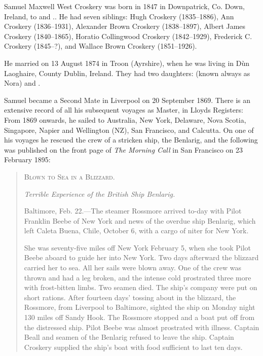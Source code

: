 
Samuel Maxwell West Croskery was born in 1847 in Downpatrick, Co. Down, Ireland, to  and .\cite{SMWC-MG-marriage}. He had seven siblings: Hugh Croskery (1835--1886), Ann Croskery (1836--1931), Alexander Brown Croskery (1838--1897), Albert James Croskery (1840--1865), Horatio Collingwood Croskery (1842--1929), Frederick C. Croskery (1845--?), and Wallace Brown Croskery (1851--1926).

He married  on 13 August 1874 in Troon (Ayrshire), when he was living in D\`{u}n Laoghaire, County Dublin, Ireland.\cite{SMWC-MG-marriage} They had two daughters:  (known always as Nora) and .

Samuel became a Second Mate in Liverpool on 20 September 1869. There is an extensive record of all his subsequent voyages as Master, in Lloyds Registers:\cite{MarineRecordsSMWC} From 1869 onwards, he sailed to Australia, New York, Delaware, Nova Scotia, Singapore, Napier and Wellington (NZ), San Francisco, and Calcutta. On one of his voyages he rescued the crew of a stricken ship, the Benlarig, and the following was published on the front page of \emph{The Morning Call} in San Francisco on 23 February 1895:

\begin{quotation}
\textsc{Blown to Sea in a Blizzard.}

\emph{Terrible Experience of the British Ship Benlarig.}

Baltimore, Feb. 22.---The steamer Rossmore arrived to-day with Pilot Franklin Beebe of New York and news of the overdue ship Benlarig, which left Caleta Buena, Chile, October 6, with a cargo of niter for New York.

She was seventy-five miles off New York February 5, when she took Pilot Beebe aboard to guide her into New York. Two days afterward the blizzard carried her to sea. All her sails were blown away. One of the crew was thrown and had a leg broken, and the intense cold prostrated three more with frost-bitten limbs. Two seamen died. The ship's company were put on short rations. After fourteen days' tossing about in the blizzard, the Rossmore, from Liverpool to Baltimore, sighted the ship on Monday night 130 miles off Sandy Hook. The Rossmore stopped and a boat put off from the distressed ship. Pilot Beebe was almost prostrated with illness. Captain Beall and seamen of the Benlarig refused to leave the ship. Captain Croskery supplied the ship's boat with food sufficient to last ten days. 
\end{quotation}

